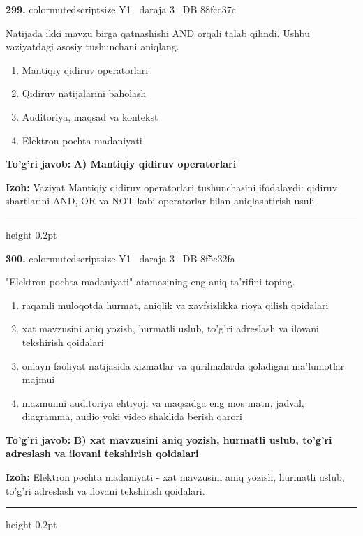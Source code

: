 \documentclass[10pt,a4paper,oneside]{article}
\begin{document}
\noindent\textbf{\color{ink}299.}  {color{muted}scriptsize Y1 \textbullet\ daraja 3 \textbullet\ DB 88fcc37c}
\par
Natijada ikki mavzu birga qatnashishi AND orqali talab qilindi. Ushbu vaziyatdagi asosiy tushunchani aniqlang.
\begin{enumerate}[label=\Alph*),leftmargin=9mm]
\item Mantiqiy qidiruv operatorlari
\item Qidiruv natijalarini baholash
\item Auditoriya, maqsad va kontekst
\item Elektron pochta madaniyati
\end{enumerate}
\begin{tcolorbox}[enhanced,breakable,colback=teal!4,colframe=teal!50!black,boxrule=0.5pt,arc=1.1mm,left=3mm,right=3mm,top=1.7mm,bottom=1.7mm,before skip=2mm,after skip=2mm]
\textbf{\color{teal}To'g'ri javob:} \textbf{A) Mantiqiy qidiruv operatorlari}
\par\smallskip
\textbf{Izoh:} Vaziyat Mantiqiy qidiruv operatorlari tushunchasini ifodalaydi: qidiruv shartlarini AND, OR va NOT kabi operatorlar bilan aniqlashtirish usuli.
\end{tcolorbox}
\vspace{2mm}\hrule height 0.2pt \vspace{3mm}

\noindent\textbf{\color{ink}300.}  {color{muted}scriptsize Y1 \textbullet\ daraja 3 \textbullet\ DB 8f5c32fa}
\par
"Elektron pochta madaniyati" atamasining eng aniq ta'rifini toping.
\begin{enumerate}[label=\Alph*),leftmargin=9mm]
\item raqamli muloqotda hurmat, aniqlik va xavfsizlikka rioya qilish qoidalari
\item xat mavzusini aniq yozish, hurmatli uslub, to'g'ri adreslash va ilovani tekshirish qoidalari
\item onlayn faoliyat natijasida xizmatlar va qurilmalarda qoladigan ma'lumotlar majmui
\item mazmunni auditoriya ehtiyoji va maqsadga eng mos matn, jadval, diagramma, audio yoki video shaklida berish qarori
\end{enumerate}
\begin{tcolorbox}[enhanced,breakable,colback=teal!4,colframe=teal!50!black,boxrule=0.5pt,arc=1.1mm,left=3mm,right=3mm,top=1.7mm,bottom=1.7mm,before skip=2mm,after skip=2mm]
\textbf{\color{teal}To'g'ri javob:} \textbf{B) xat mavzusini aniq yozish, hurmatli uslub, to'g'ri adreslash va ilovani tekshirish qoidalari}
\par\smallskip
\textbf{Izoh:} Elektron pochta madaniyati - xat mavzusini aniq yozish, hurmatli uslub, to'g'ri adreslash va ilovani tekshirish qoidalari.
\end{tcolorbox}
\vspace{2mm}\hrule height 0.2pt \vspace{3mm}
\end{document}
